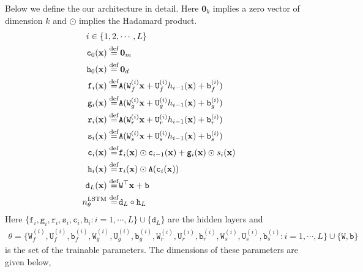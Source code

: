 Below we define the our architecture in detail. Here $\mathbf 0_k$ implies a zero vector of dimension $k$ and $\odot$ implies the Hadamard product.
\begin{align}
    i\in\{1,2,&\cdots, L\}\\
    \mathtt c_0(\mathbf x)\stackrel{\rm def}{=}&\,\mathbf 0_m\label{eq:layer-c0--steady-fp}\\
    \mathtt h_0(\mathbf x)\stackrel{\rm def}{=}&\,\mathbf 0_d\label{eq:layer-h0--steady-fp}\\
    \mathtt f_i(\mathbf x) \stackrel{\rm def}{=}& \mathtt A(\mathtt W_f^{(i)}\mathbf x + \mathtt U_f^{(i)}h_{i-1}(\mathbf x) + \mathtt b_f^{(i)})\label{eq:layer-f--steady-fp}\\
    \mathtt g_i(\mathbf x) \stackrel{\rm def}{=}& \mathtt A(\mathtt W_g^{(i)}\mathbf x + \mathtt U_g^{(i)}h_{i-1}(\mathbf x) + \mathtt b_g^{(i)})\label{eq:layer-g--steady-fp}\\
    \mathtt r_i(\mathbf x) \stackrel{\rm def}{=}& \mathtt A(\mathtt W_r^{(i)}\mathbf x + \mathtt U_r^{(i)}h_{i-1}(\mathbf x) + \mathtt b_r^{(i)})\label{eq:layer-r--steady-fp}\\
    \mathtt s_i(\mathbf x) \stackrel{\rm def}{=}& \mathtt A(\mathtt W_s^{(i)}\mathbf x + \mathtt U_s^{(i)}h_{i-1}(\mathbf x) + \mathtt b_s^{(i)})\label{eq:layer-s--steady-fp}\\
    \mathtt c_i(\mathbf x) \stackrel{\rm def}{=}&  \mathtt f_i(\mathbf x)\odot \mathtt c_{i-1}(\mathbf x) + \mathtt g_i(\mathbf x)\odot s_i(\mathbf x)\label{eq:layer-c--steady-fp}\\
    \mathtt h_i(\mathbf x) \stackrel{\rm def}{=}& \mathtt r_i(\mathbf x)\odot \mathtt A(\mathtt c_i(\mathbf x))\label{eq:layer-h--steady-fp}\\
    \mathtt d_L(\mathbf x)\stackrel{\rm def}{=}&\mathtt W^\top\mathbf x + \mathtt b\label{eq:layer-final--steady-fp}\\
    n^{\rm LSTM}_\theta \stackrel{\rm def}{=}& \mathtt d_L\circ \mathtt h_L\label{eq:def-LSTM--steady-fp} 
\end{align}
Here $\{\mathtt f_i, \mathtt g_i, \mathtt r_i, \mathtt s_i, \mathtt c_i, \mathtt h_i: i=1,\cdots,L\}\cup\{\mathtt d_L\}$ are the hidden layers and
\begin{align}
    \theta=\{\mathtt W_f^{(i)}, \mathtt U_f^{(i)}, \mathtt b_f^{(i)}, \mathtt W_g^{(i)}, \mathtt U_g^{(i)}, \mathtt b_g^{(i)}, \mathtt W_r^{(i)}, \mathtt U_r^{(i)}, \mathtt b_r^{(i)}, \mathtt W_s^{(i)}, \mathtt U_s^{(i)}, \mathtt b_s^{(i)}:
i=1,\cdots,L\}\cup\{\mathtt W, \mathtt b\}\label{eq:theta-composition--steady-fp}
\end{align}is the set of the trainable parameters. The dimensions of these parameters are given below,
